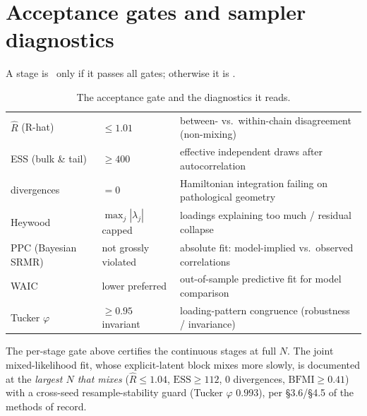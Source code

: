 \section{Acceptance gates and sampler diagnostics}
\label{app:gates}
A stage is \certified\ only if it passes all gates; otherwise it is \provisional.
\begin{table}[h]\centering\small\sffamily
\caption{The acceptance gate and the diagnostics it reads.}
\begin{tabular}{L{3.4cm} L{4.0cm} L{6.6cm}}
\toprule
{} &  & \\
\midrule
{} $\widehat{R}$ (R-hat) & $\le 1.01$ & between- vs.\ within-chain disagreement (non-mixing)\\
ESS (bulk \& tail) & $\ge 400$ & effective independent draws after autocorrelation\\
 divergences & $=0$ & Hamiltonian integration failing on pathological geometry\\
Heywood & $\max_j|\lambda_j|$ capped & loadings explaining too much / residual collapse\\
 PPC (Bayesian SRMR) & not grossly violated & absolute fit: model-implied vs.\ observed correlations\\
WAIC & lower preferred & out-of-sample predictive fit for model comparison\\
 Tucker $\varphi$ & $\ge 0.95$ invariant & loading-pattern congruence (robustness / invariance)\\
\bottomrule
\end{tabular}
\end{table}

The per-stage gate above certifies the continuous stages at full $N$. The joint mixed-likelihood fit, whose
explicit-latent block mixes more slowly, is documented at the \emph{largest $N$ that mixes} ($\widehat{R}\le
1.04$, $\mathrm{ESS}\ge 112$, $0$ divergences, $\mathrm{BFMI}\ge 0.41$) with a cross-seed resample-stability
guard (Tucker $\varphi$ $0.993$), per §3.6/§4.5 of the methods of record.

